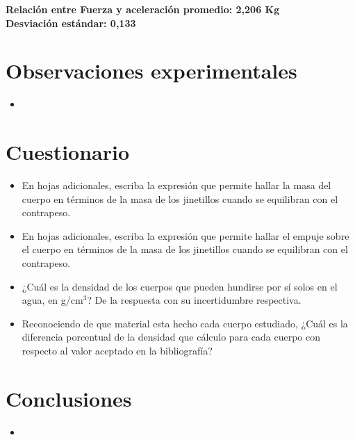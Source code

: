 \documentclass[10pt]{article}
\begin{document}
\hspace{2,5cm}
\textbf{Relación entre Fuerza y aceleración promedio: 2,206 Kg}\\

\vspace{-0,2cm}
\hspace{2,5cm} 
\textbf{Desviación estándar: 0,133}



\section{Observaciones experimentales}

\begin{itemize}
    \item
\end{itemize}

\section{Cuestionario}
\begin{itemize}
    \item En hojas adicionales, escriba la expresión que permite hallar la masa del cuerpo en términos de la masa de los jinetillos cuando se equilibran con el contrapeso.
    \item En hojas adicionales, escriba la expresión que permite hallar el empuje sobre el cuerpo en términos de la masa de los jinetillos cuando se equilibran con el contrapeso.
    \item ¿Cuál es la densidad de los cuerpos que pueden hundirse por sí solos en el agua, en g/cm$^{3}$? De la respuesta con su incertidumbre respectiva.
    \item Reconociendo de que material esta hecho cada cuerpo estudiado, ¿Cuál es la diferencia porcentual de la densidad que cálculo para cada cuerpo con respecto al valor aceptado en la bibliografía?    
\end{itemize}

\section{Conclusiones}
\begin{itemize}
    \item
\end{itemize}
\end{document}
